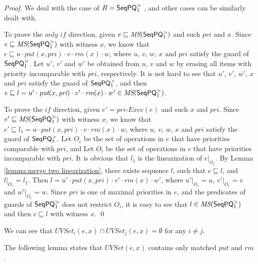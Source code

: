 \priExecutionIsEnough*
\begin {proof}

We deal with the case of $R = \mathsf{SeqPQ}_1^{>}$ , and other cases can be similarly dealt with.

To prove the $\textit{only if}$ direction, given $e \sqsubseteq \textit{MS}(\mathsf{SeqPQ}_1^{>})$ and such $\textit{pri}$ and $x$. Since $e \sqsubseteq \textit{MS}(\mathsf{SeqPQ}_1^{>})$ with witness $x$, we know that $e \sqsubseteq u \cdot \textit{put}(x,\textit{pri}) \cdot v \cdot \textit{rm}(x) \cdot w$, where $u$, $v$, $w$, $x$ and $\textit{pri}$ satisfy the guard of $\mathsf{SeqPQ}_1^{>}$. Let $u'$, $v'$ and $w'$ be obtained from $u$, $v$ and $w$ by erasing all items with priority incomparable with $\textit{pri}$, respectively. It is not hard to see that $u'$, $v'$, $w'$, $x$ and $\textit{pri}$ satisfy the guard of $\mathsf{SeqPQ}_1^{>}$, and then $e \sqsubseteq l = u' \cdot \textit{put}(x,\textit{pri}) \cdot v' \cdot \textit{rm}(x) \cdot w' \in \textit{MS}(\mathsf{SeqPQ}_1^{>})$.

To prove the $\textit{if}$ direction, given $e' = \textit{pri-Exec}(e)$ and such $x$ and $\textit{pri}$. Since $e' \sqsubseteq \textit{MS}(\mathsf{SeqPQ}_1^{>})$ with witness $x$, we know that $e' \sqsubseteq l_1 = u \cdot \textit{put}(x,\textit{pri}) \cdot v \cdot \textit{rm}(x) \cdot w$, where $u$, $v$, $w$, $x$ and $\textit{pri}$ satisfy the guard of $\mathsf{SeqPQ}_1^{>}$. Let $O_c$ be the set of operations in $e$ that have priorities comparable with $\textit{pri}$, and Let $O_i$ be the set of operations in $e$ that have priorities incomparable with $\textit{pri}$. It is obvious that $l_1$ is the linearization of $e \vert_{O_c}$. By Lemma \ref{lemma:merge two linearization}, there exists sequence $l$, such that $e \sqsubseteq l$, and $l \vert_{O_c} = l_1$. Then $l = u' \cdot \textit{put}(x,\textit{pri}) \cdot v' \cdot \textit{rm}(x) \cdot w'$, where $u' \vert_{O_c} = u$, $v' \vert_{O_c} = v$ and $w' \vert_{O_c} = w$. Since $\textit{pri}$ is one of maximal priorities in $e$, and the predicates of guards of $\mathsf{SeqPQ}_1^{>}$ does not restrict $O_i$, it is easy to see that $l \in \textit{MS}(\mathsf{SeqPQ}_1^{>})$ and then $e \sqsubseteq l$ with witness $x$. \qed
\end {proof}


We can see that $\textit{UVSet}_i(e,x) \cap \textit{UVSet}_j(e,x) = \emptyset$ for any $i \neq j$.

The following lemma states that $\textit{UVSet}(e,x)$ contains only matched $\textit{put}$ and $\textit{rm}$.

